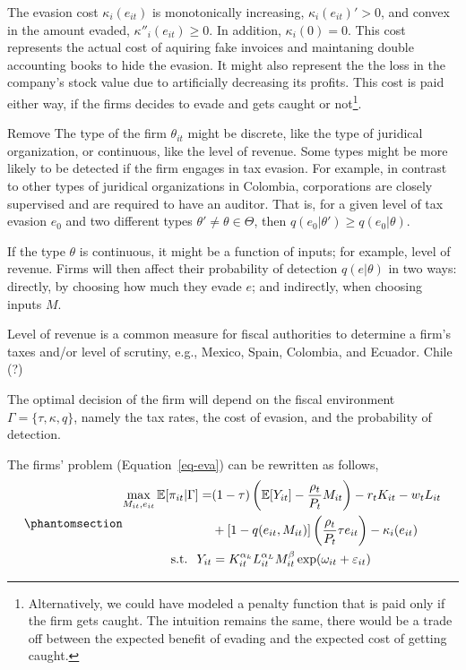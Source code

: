 \documentclass[
  12pt]{article}
\theoremstyle{definition}
\theoremstyle{remark}
\begin{document}
The evasion cost \(\kappa_i(e_{it})\) is monotonically increasing,
\(\kappa_i(e_{it})'>0\), and convex in the amount evaded,
\(\kappa''_i(e_{it})\ge0\). In addition, \(\kappa_i(0)=0\). This cost
represents the actual cost of aquiring fake invoices and maintaning
double accounting books to hide the evasion. It might also represent the
the loss in the company's stock value due to artificially decreasing its
profits. This cost is paid either way, if the firms decides to evade and
gets caught or not\footnote{Alternatively, we could have modeled a
  penalty function that is paid only if the firm gets caught. The
  intuition remains the same, there would be a trade off between the
  expected benefit of evading and the expected cost of getting caught.}.

\begin{anfxnote}{Remove}
The type of the firm \(\theta_{it}\) might be discrete, like the type of
juridical organization, or continuous, like the level of revenue. Some
types might be more likely to be detected if the firm engages in tax
evasion. For example, in contrast to other types of juridical
organizations in Colombia, corporations are closely supervised and are
required to have an auditor. That is, for a given level of tax evasion
\(e_0\) and two different types
\(\theta' \not= \theta \in \mathbfcal{\Theta}\), then
\(q(e_0|\theta')\ge q(e_0|\theta)\).

If the type \(\theta\) is continuous, it might be a function of inputs;
for example, level of revenue. Firms will then affect their probability
of detection \(q(e|\theta)\) in two ways: directly, by choosing how much
they evade \(e\); and indirectly, when choosing inputs \(M\).

Level of revenue is a common measure for fiscal authorities to determine
a firm's taxes and/or level of scrutiny, e.g., Mexico, Spain, Colombia,
and Ecuador. Chile (?)

\end{anfxnote}

The optimal decision of the firm will depend on the fiscal environment
\(\Gamma=\{\tau, \kappa, q \}\), namely the tax rates, the cost of
evasion, and the probability of detection.

The firms' problem (Equation~\ref{eq-eva}) can be rewritten as follows,
\begin{equation}\phantomsection\label{eq-eva-2}{
\begin{aligned}
  \max_{M_{it},e_{it}} \mathbb{E}[\pi_{it}|\Gamma] = &(1-\tau)\left(\mathbb{E}[Y_{it}]-\frac{\rho_{t}}{P_t} M_{it}\right)-r_tK_{it}-w_tL_{it}\\
  &+[1-q(e_{it}, M_{it})]\left(\frac{\rho_{t}}{P_t}\tau e_{it}\right)
  -\kappa_i(e_{it}) \\
  \text{s.t. }\; Y_{it}&=K_{it}^{\alpha_k}L_{it}^{\alpha_L}M_{it}^{\beta}\exp(\omega_{it}+\varepsilon_{it})
\end{aligned}
}\end{equation}
\end{document}
